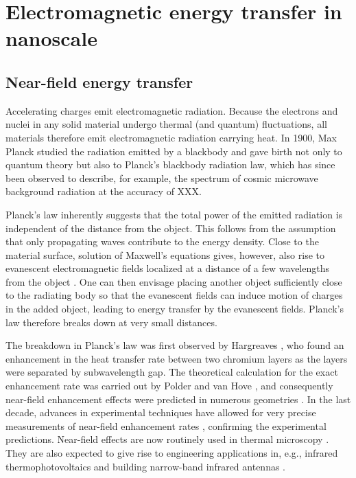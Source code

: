 

\section{Electromagnetic energy transfer in nanoscale}

\subsection{Near-field energy transfer}
Accelerating charges emit electromagnetic radiation. Because the electrons and nuclei in any solid material undergo thermal (and quantum) fluctuations, all materials therefore emit electromagnetic radiation carrying heat. In 1900, Max Planck \cite{planck00a} studied the radiation emitted by a blackbody and gave birth not only to quantum theory but also to Planck's blackbody radiation law, which has since been observed to describe, for example, the spectrum of cosmic microwave background radiation at the accuracy of XXX.

Planck's law inherently suggests that the total power of the emitted radiation is independent of the distance from the object. This follows from the assumption that only propagating waves contribute to the energy density. Close to the material surface, solution of Maxwell's equations gives, however, also rise to evanescent electromagnetic fields localized at a distance of a few wavelengths from the object \cite{polder71}. One can then envisage placing another object sufficiently close to the radiating body so that the evanescent fields can induce motion of charges in the added object, leading to energy transfer by the evanescent fields. Planck's law therefore breaks down at very small distances. 

The breakdown in Planck's law was first observed by Hargreaves \cite{hargreaves69}, who found an enhancement in the heat transfer rate between two chromium layers as the layers were separated by subwavelength gap. The theoretical calculation for the exact enhancement rate was carried out by Polder and van Hove \cite{polder71}, and consequently near-field enhancement effects were predicted in numerous geometries \cite{loomis94,pendry99,carminati99,shchegrov00,mulet01,volokitin01}. In the last decade, advances in experimental techniques have allowed for very precise measurements of near-field enhancement rates \cite{}, confirming the experimental predictions. Near-field effects are now routinely used in thermal microscopy \cite{majumdar99,muller-hirsch99,kittel05,kittel08}. They are also expected to give rise to engineering applications in, e.g., infrared thermophotovoltaics \cite{dimatteo01,narayanaswamy03,laroche06} and building narrow-band infrared antennas \cite{greffet02}. 

